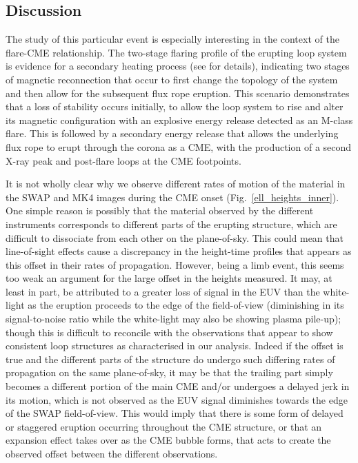 \documentclass[namedreferences]{solarphysics}
\begin{document}
\begin{article}
\section{Discussion}
\label{sect:discussion}

The study of this particular event is especially interesting in the context of the flare-CME relationship. The two-stage flaring profile of the erupting loop system is evidence for a secondary heating process (see  for details), indicating two stages of magnetic reconnection that occur to first change the topology of the system and then allow for the subsequent flux rope eruption. This scenario demonstrates that a loss of stability occurs initially, to allow the loop system to rise and alter its magnetic configuration with an explosive energy release detected as an M-class flare. This is followed by a secondary energy release that allows the underlying flux rope to erupt through the corona as a CME, with the production of a second X-ray peak and post-flare loops at the CME footpoints.


{\bf 

It is not wholly clear why we observe different rates of motion of the material in the SWAP and MK4 images during the CME onset (Fig.~\ref{ell_heights_inner}). One simple reason is possibly that the material observed by the different instruments corresponds to different parts of the erupting structure, which are difficult to dissociate from each other on the plane-of-sky. This could mean that line-of-sight effects cause a discrepancy in the height-time profiles that appears as this offset in their rates of propagation. However, being a limb event, this seems too weak an argument for the large offset in the heights measured. It may, at least in part, be attributed to a greater loss of signal in the EUV than the white-light as the eruption proceeds to the edge of the field-of-view (diminishing in its signal-to-noise ratio while the white-light may also be showing plasma pile-up); though this is difficult to reconcile with the observations that appear to show consistent loop structures as characterised in our analysis. Indeed if the offset is true and the different parts of the structure do undergo such differing rates of propagation on the same plane-of-sky, it may be that the trailing part simply becomes a different portion of the main CME and/or undergoes a delayed jerk in its motion, which is not observed as the EUV signal diminishes towards the edge of the SWAP field-of-view. This would imply that there is some form of delayed or staggered eruption occurring throughout the CME structure, or that an expansion effect takes over as the CME bubble forms, that acts to create the observed offset between the different observations. 



}
\end{article}
\end{document}
